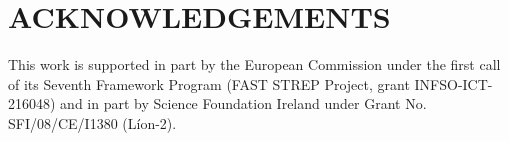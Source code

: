 \documentclass[a4paper,twoside]{article}
\begin{document}
\onecolumn \maketitle \normalsize \vfill













\section*{ACKNOWLEDGEMENTS} This work is supported in part by the European Commission under the first call of its Seventh Framework Program (FAST STREP Project, grant INFSO-ICT-216048) and in part by Science Foundation Ireland under Grant No. SFI/08/CE/I1380 (L\'ion-2).

\renewcommand{\baselinestretch}{0.98}

{\small
}
\renewcommand{\baselinestretch}{1}
\end{document}
